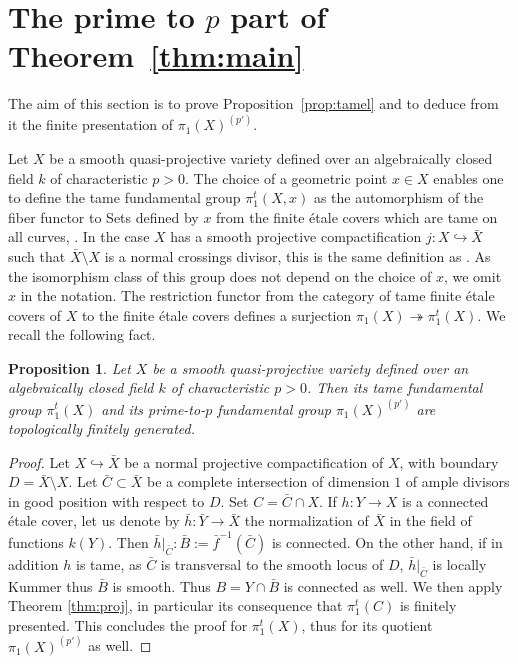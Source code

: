 \documentclass[12pt]{amsart}
\theoremstyle{plain}
\newtheorem{prop}[thm]{Proposition}
\theoremstyle{definition}
\numberwithin{thm}{section}
\newcommand{\surj}{\twoheadrightarrow}
\numberwithin{equation}{section}
\begin{document}
\section{ The  prime to $p$ part of Theorem~\ref{thm:main}} \label{sec:pprime}

The aim of this section is to prove Proposition~\ref{prop:tamel} and  to deduce from it the finite presentation of $\pi_1(X)^{(p')}$. 




 Let $X$ be a smooth quasi-projective variety defined over an algebraically closed field $k$ of characteristic $p>0$. The choice of a geometric point $x\in X$ enables one to define the tame fundamental group $\pi^t_1(X,x)$  as the automorphism of the fiber functor to Sets  defined by $x$ from the finite \'etale covers which are tame on all curves, 
 \cite[Sec.~4, Definitions, Theorem.~4.4]{KS10}.  In the case $X$ has a smooth projective compactification $j: X\hookrightarrow \bar X$ such that $\bar X\setminus X$ is a  normal crossings divisor, this  is the same definition as \cite[Section~2.2]{GM71}.
  As the isomorphism class of this group does not depend on the choice of $x$, we omit $x$ in the notation. The restriction functor from the category of tame finite \'etale covers of $X$ to the finite \'etale covers 
  defines a surjection $\pi_1(X)\surj \pi_1^t(X)$. We recall the following fact.
  \begin{prop} \label{prop:fg}
   Let $X$ be a smooth quasi-projective variety defined over an algebraically closed field $k$ of characteristic $p>0$. Then its tame fundamental group $\pi_1^t(X)$ and its prime-to-$p$ fundamental group $\pi_1(X)^{(p')}$ are topologically finitely generated.
  
  \end{prop}
  
  \begin{proof}


Let $X \hookrightarrow \bar{X}$ be a normal projective compactification of $X$, with boundary $D=\bar{X}\setminus X$. Let $\bar{C}\subset \bar{X}$ be a complete intersection of dimension $1$ of ample divisors in good position with respect to $D$. Set $C=\bar{C}\cap X$. If $h: Y\to X$ is a connected  \'etale cover,  let us denote by $\bar h: \bar Y\to \bar X$ the normalization of $\bar X$ in the field of functions $k(Y)$. Then $\bar h|_{\bar C}: \bar{B}:=\bar{f}^{-1}(\bar{C})$ is connected. On the other hand, if in addition $h$ is tame, as  $\bar C$  is transversal to the smooth locus of $D$,  $\bar h|_{\bar C}$ is locally Kummer thus $\bar B$ is smooth.  Thus $B=Y\cap \bar B $ is connected as well. 
We then apply Theorem \ref{thm:proj}, in particular its consequence that $\pi_1^t(C)$ is finitely presented.  This concludes the proof for $\pi^t_1(X)$, thus for its quotient $\pi_1(X)^{(p')}$ as well. 
    
\end{proof}
 
\end{document}
